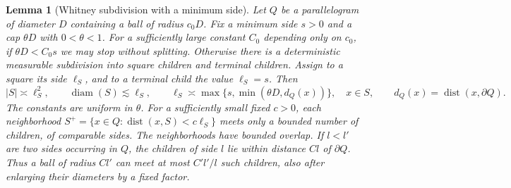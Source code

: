 \documentclass[11pt]{article}
\newtheorem{lemma}{Lemma}
\newcommand{\1}{\mathbf{1}}
\numberwithin{equation}{section}
\begin{document}
\begin{lemma}[Whitney subdivision with a minimum side]
\label{lem:local-geometry}
Let \(Q\) be a parallelogram of diameter \(D\) containing a ball
of radius \(c_0D\). Fix a minimum side \(s>0\) and a cap
\(\theta D\) with \(0<\theta<1\). For a sufficiently large
constant \(C_0\) depending only on \(c_0\), if
\(\theta D<C_0s\) we may stop without splitting. Otherwise
there is a deterministic measurable subdivision into square
children and terminal children. Assign to a square its side
\(\ell_S\), and to a terminal child the value \(\ell_S=s\).
Then
\[
 |S|\asymp\ell_S^2,\qquad
 \operatorname{diam}(S)\lesssim\ell_S,\qquad
 \ell_S\asymp\max\{s,\min(\theta D,d_Q(x))\},\quad x\in S,
 \qquad d_Q(x)=\operatorname{dist}(x,\partial Q).
\]
The constants are uniform in \(\theta\). For a sufficiently
small fixed \(c>0\), each neighborhood
\(S^+=\{x\in Q:\operatorname{dist}(x,S)<c\ell_S\}\)
meets only a bounded number of children, of comparable sides.
The neighborhoods have bounded overlap. If \(l<l'\) are two
sides occurring in \(Q\), the children of side \(l\) lie within
distance \(Cl\) of \(\partial Q\). Thus a ball of radius \(Cl'\)
can meet at most \(C' l'/l\) such children, also after enlarging
their diameters by a fixed factor.
\end{lemma}
\end{document}
